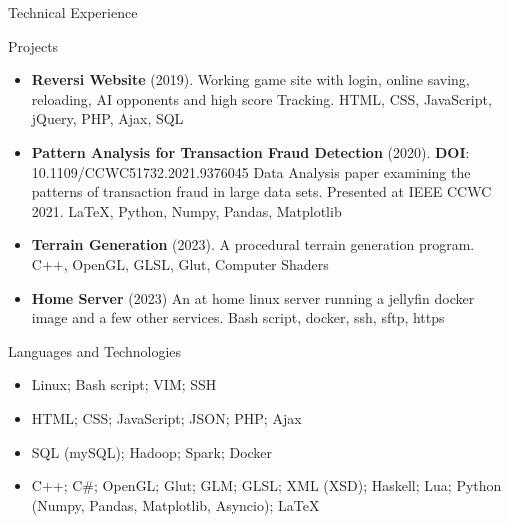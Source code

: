 \documentclass[]{mcdowellcvcustom}
\begin{document}
	\vspace{10mm}
	
	\begin{cvsection}{Technical Experience}
		\begin{cvsubsection}{Projects}{}{}
			\begin{itemize}
				\item \textbf{Reversi Website} (2019). Working game site with login, online saving, reloading, AI opponents and high score Tracking.  HTML, CSS, JavaScript, jQuery, PHP, Ajax, SQL
				\item \textbf{Pattern Analysis for Transaction Fraud Detection} (2020). \textbf{DOI}: 10.1109/CCWC51732.2021.9376045 Data Analysis paper examining the patterns of transaction fraud in large data sets. Presented at IEEE CCWC 2021. \LaTeX, Python, Numpy, Pandas, Matplotlib
				\item \textbf{Terrain Generation} (2023). A procedural terrain generation program.  C++, OpenGL, GLSL, Glut, Computer Shaders
				\item \textbf{Home Server} (2023) An at home linux server running a jellyfin docker image and a few other services. Bash script, docker, ssh, sftp, https
				
			\end{itemize}
		\end{cvsubsection}
	\end{cvsection}
	
	\vspace{10mm}

	\begin{cvsection}{Languages and Technologies}
		\begin{cvsubsection}{}{}{}	
			\begin{itemize}
				\item Linux; Bash script; VIM; SSH
				\item HTML; CSS; JavaScript; JSON; PHP; Ajax
				\item SQL (mySQL); Hadoop; Spark; Docker
				\item C++; C\#; OpenGL; Glut; GLM; GLSL; XML (XSD); Haskell; Lua; Python (Numpy, Pandas, Matplotlib, Asyncio); \LaTeX  
			\end{itemize}
		\end{cvsubsection}
	\end{cvsection}
	
\end{document}
